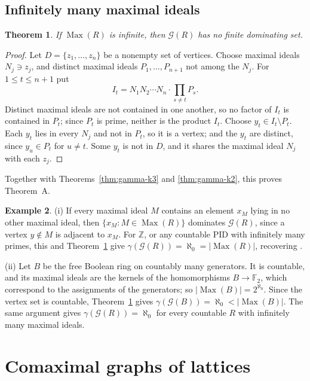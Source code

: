 \documentclass[11pt]{amsart}
\newtheorem{theorem}{Theorem}[section]
\theoremstyle{definition}
\newtheorem{example}[theorem]{Example}
\theoremstyle{remark}
\newcommand{\Max}{\operatorname{Max}}
\newcommand{\G}{\mathcal{G}}
\newcommand{\Z}{\mathbb{Z}}
\newcommand{\FF}{\mathbb{F}}
\begin{document}
\subsection{Infinitely many maximal ideals}

\begin{theorem}\label{thm:infinite}
If $\Max(R)$ is infinite, then $\G(R)$ has no finite dominating set.
\end{theorem}

\begin{proof}
Let $D=\{z_1,\dots,z_n\}$ be a nonempty set of vertices. Choose maximal ideals $N_j\ni z_j$, and
distinct maximal ideals $P_1,\dots,P_{n+1}$ not among the $N_j$. For $1\le t\le n+1$ put
\[
  I_t=N_1N_2\cdots N_n\cdot\prod_{s\neq t}P_s .
\]
Distinct maximal ideals are not contained in one another, so no factor of $I_t$ is contained in
$P_t$; since $P_t$ is prime, neither is the product $I_t$. Choose $y_t\in I_t\setminus P_t$. Each $y_t$ lies in every $N_j$ and not in $P_t$, so it is a
vertex; and the $y_t$ are distinct,
since $y_u\in P_t$ for $u\ne t$. Some $y_t$ is not in $D$, and it shares the maximal ideal $N_j$ with
each $z_j$.
\end{proof}

Together with Theorems~\ref{thm:gamma-k3} and \ref{thm:gamma-k2}, this proves Theorem~A.

\begin{example}\label{ex:boolean-infinite}
(i) If every maximal ideal $M$ contains an element $x_M$ lying in no other maximal ideal, then
$\{x_M:M\in\Max(R)\}$ dominates $\G(R)$, since a vertex $y\notin M$ is adjacent to $x_M$.
For $\Z$, or any countable PID with infinitely many primes, this and Theorem~\ref{thm:infinite} give
$\gamma(\G(R))=\aleph_0=|\Max(R)|$, recovering \cite[Example~3.11(b)]{MR15}.

(ii) Let $B$ be the free Boolean ring on countably many generators. It is countable, and its maximal
ideals are the kernels of the homomorphisms $B\to\FF_2$, which correspond to the assignments of the
generators; so $|\Max(B)|=2^{\aleph_0}$. Since the vertex set is countable,
Theorem~\ref{thm:infinite} gives $\gamma(\G(B))=\aleph_0<|\Max(B)|$. The same argument gives $\gamma(\G(R))=\aleph_0$ for every
countable $R$ with infinitely many maximal ideals.
\end{example}

\section{Comaximal graphs of lattices}\label{sec:lattices}
\end{document}
